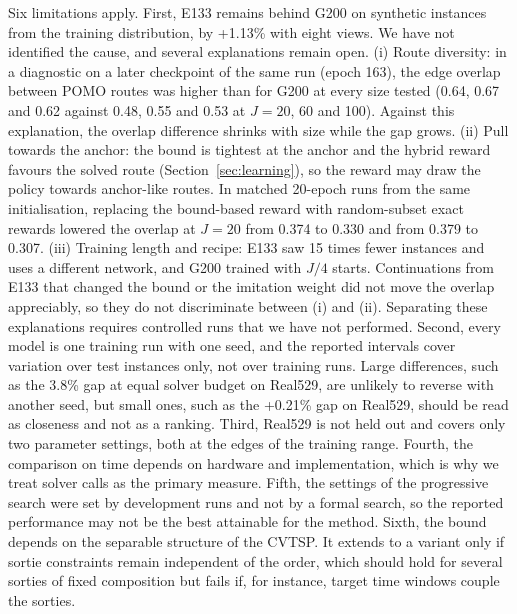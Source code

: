 \documentclass[preprint,12pt,authoryear]{elsarticle}
\begin{document}
Six limitations apply. First, E133 remains behind G200 on synthetic instances from the training distribution, by +1.13\% with eight views. We have not identified the cause, and several explanations remain open. (i) Route diversity: in a diagnostic on a later checkpoint of the same run (epoch 163), the edge overlap between POMO routes was higher than for G200 at every size tested (0.64, 0.67 and 0.62 against 0.48, 0.55 and 0.53 at $J = 20$, 60 and 100). Against this explanation, the overlap difference shrinks with size while the gap grows. (ii) Pull towards the anchor: the bound is tightest at the anchor and the hybrid reward favours the solved route (Section~\ref{sec:learning}), so the reward may draw the policy towards anchor-like routes. In matched 20-epoch runs from the same initialisation, replacing the bound-based reward with random-subset exact rewards lowered the overlap at $J = 20$ from 0.374 to 0.330 and from 0.379 to 0.307. (iii) Training length and recipe: E133 saw 15 times fewer instances and uses a different network, and G200 trained with $J/4$ starts. Continuations from E133 that changed the bound or the imitation weight did not move the overlap appreciably, so they do not discriminate between (i) and (ii). Separating these explanations requires controlled runs that we have not performed. Second, every model is one training run with one seed, and the reported intervals cover variation over test instances only, not over training runs. Large differences, such as the 3.8\% gap at equal solver budget on Real529, are unlikely to reverse with another seed, but small ones, such as the +0.21\% gap on Real529, should be read as closeness and not as a ranking. Third, Real529 is not held out and covers only two parameter settings, both at the edges of the training range. Fourth, the comparison on time depends on hardware and implementation, which is why we treat solver calls as the primary measure. Fifth, the settings of the progressive search were set by development runs and not by a formal search, so the reported performance may not be the best attainable for the method. Sixth, the bound depends on the separable structure of the CVTSP. It extends to a variant only if sortie constraints remain independent of the order, which should hold for several sorties of fixed composition but fails if, for instance, target time windows couple the sorties.
\end{document}
